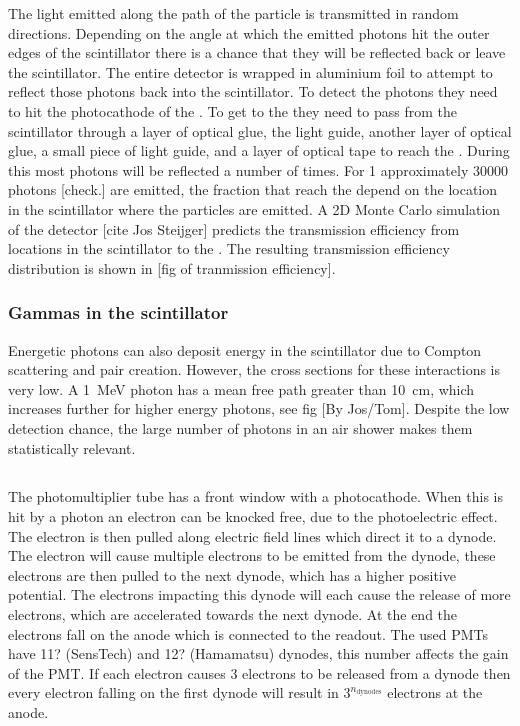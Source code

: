 The light emitted along the path of the particle is transmitted in random directions. Depending on the angle at which the emitted photons hit the outer edges of the scintillator there is a chance that they will be reflected back or leave the scintillator. The entire detector is wrapped in aluminium foil to attempt to reflect those photons back into the scintillator. To detect the photons they need to hit the photocathode of the \pmt. To get to the \pmt they need to pass from the scintillator through a layer of optical glue, the light guide, another layer of optical glue, a small piece of light guide, and a layer of optical tape to reach the \pmt. During this most photons will be reflected a number of times. For \SI{1}{\mip} approximately 30000 photons [check.] are emitted, the fraction that reach the \pmt depend on the location in the scintillator where the particles are emitted. A 2D Monte Carlo simulation of the detector [cite Jos Steijger] predicts the transmission efficiency from locations in the scintillator to the \pmt. The resulting transmission efficiency distribution is shown in [fig of tranmission efficiency].


\subsubsection{Gammas in the scintillator}

Energetic photons can also deposit energy in the scintillator due to Compton scattering and pair creation. However, the cross sections for these interactions is very low. A \SI{1}{\MeV} photon  has a mean free path greater than \SI{10}{\centi\meter}, which increases further for higher energy photons, see fig [By Jos/Tom]. Despite the low detection chance, the large number of photons in an air shower makes them statistically relevant.


\subsection{\pmt}

The photomultiplier tube has a front window with a photocathode. When this is hit by a photon an electron can be knocked free, due to the photoelectric effect. The electron is then pulled along electric field lines which direct it to a dynode. The electron will cause multiple electrons to be emitted from the dynode, these electrons are then pulled to the next dynode, which has a higher positive potential. The electrons impacting this dynode will each cause the release of more electrons, which are accelerated towards the next dynode. At the end the electrons fall on the anode which is connected to the readout. The used PMTs have 11? (SensTech) and 12? (Hamamatsu) dynodes, this number affects the gain of the PMT. If each electron causes \num{3} electrons to be released from a dynode then every electron falling on the first dynode will result in $3^{n_{\mathrm{dynodes}}}$ electrons at the anode.

